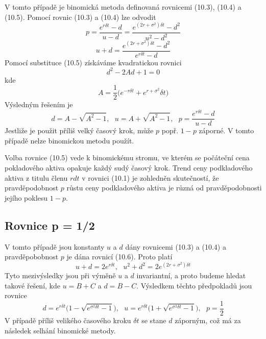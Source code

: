 \documentclass[a4paper]{book}
\begin{document}
V tomto případě je binomická metoda definovaná rovnicemi (10.3), (10.4) a (10.5). Pomocí rovnic (10.3) a (10.4) lze odvodit
\begin{equation*}
p = \frac{e^{r \delta t} - d}{u - d} = \frac{e^{(2r + \sigma^2)\delta t} - d^2}{u^2 - d^2}
\end{equation*}
\begin{equation*}
u + d = \frac{e^{(2r + \sigma^2)\delta t} - d^2}{e^{r \delta t} - d}
\end{equation*}
Pomocí substituce (10.5) získáváme kvadratickou rovnici
\begin{equation*}
d^2 - 2 A d + 1 = 0
\end{equation*}
kde
\begin{equation*}
A = \frac{1}{2}\Big( e^{-r \delta t} + e^{r + \sigma^2}\delta t \Big)
\end{equation*}
Výsledným řešením je
\begin{equation}
d = A - \sqrt{A^2 - 1},~~~u = A + \sqrt{A^2 - 1},~~~p = \frac{e^{r \delta t} - d}{u - d}
\end{equation}
Jestliže je použit příliš velký časový krok, může $p$ popř. $1-p$ záporné. V tomto případě nelze binomickou metodu použít.

Volba rovnice (10.5) vede k binomickému stromu, ve kterém se počáteční cena pokladového aktiva opakuje každý sudý časový krok. Trend ceny podkladového aktiva z titulu členu $rdt$ v rovnici (10.1) je zohledněn skutečností, že pravděpodobnost $p$ růstu ceny podkladového aktiva je různá od pravděpodobnosti jejího poklesu $1 - p$.

\subsection{Rovnice p = 1/2}

V tomto případě jsou konstanty $u$ a $d$ dány rovnicemi (10.3) a (10.4) a pravděpobobnost $p$ je dána rovnicí (10.6). Proto platí
\begin{equation*}
u + d = 2e^{r \delta t}, ~~~ u^2 + d^2 = 2e^{(2r + \sigma^2) \delta t}
\end{equation*}
Tyto mezivýsledky jsou při výměně $u$ a $d$ invariantní, a proto budeme hledat takové řešení, kde $u = B + C$ a $d = B - C$. Výsledkem těchto předpokladů jsou rovnice
\begin{equation}
d = e^{r \delta t}\Big( 1 - \sqrt{e^{\sigma^2 \delta t} - 1} \Big), ~~~ u = e^{r \delta t}\Big( 1 + \sqrt{e^{\sigma^2 \delta t} - 1} \Big), ~~~ p = \frac{1}{2}
\end{equation}
V případě příliš velikého časového kroku $\delta t$ se stane $d$ záporným, což má za následek selhání binomické metody.
\end{document}
